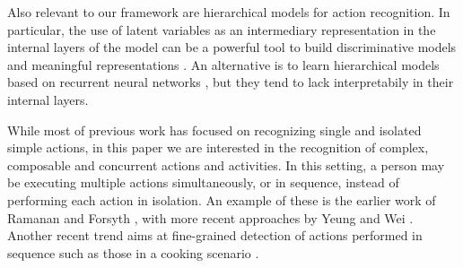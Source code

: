 Also relevant to our framework are hierarchical models for action
recognition. In particular, the use of latent variables as an intermediary
representation in the internal layers of the model can be a powerful
tool to build discriminative models and meaningful representations
\cite{Hu2014, Wang2008}. An alternative is to learn hierarchical models
based on recurrent neural networks \cite{YongDu2015}, but they tend to lack
interpretabily in their internal layers.


While most of previous work has focused on recognizing single and isolated
simple actions, in this paper we are interested in the recognition
of complex, composable \cite{Lillo2014} and concurrent \cite{Wei2013} actions
and activities. In this setting, a person may be executing multiple actions
simultaneously, or in sequence, instead of performing each action in isolation.
An example of these is the earlier work of Ramanan and Forsyth \cite{Ramanan2003},
with more recent approaches by Yeung \etal \cite{Yeung2015} and
Wei \etal \cite{Wei2013}.
Another recent trend aims at fine-grained detection of actions performed in sequence
such as those in a cooking scenario \cite{Rohrbach2012, Lan2015}.

